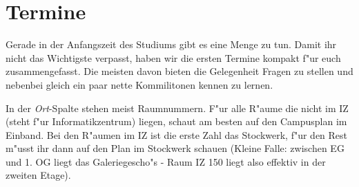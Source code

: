 \section{Termine}
\label{termine}
Gerade in der Anfangszeit des Studiums gibt es eine Menge zu tun. Damit ihr
nicht das Wichtigste verpasst, haben wir die ersten Termine kompakt f"ur
euch zusammengefasst. Die meisten davon bieten die Gelegenheit Fragen zu
stellen und nebenbei gleich ein paar nette Kommilitonen kennen zu lernen.

In der \textit{Ort}-Spalte stehen meist Raumnummern. F"ur alle R"aume die nicht
im IZ (steht f"ur Informatikzentrum) liegen, schaut am besten auf den
Campusplan im Einband. Bei den R"aumen im IZ ist die erste Zahl das Stockwerk, f"ur
den Rest m"usst ihr dann auf den Plan im Stockwerk schauen (Kleine Falle:
zwischen EG und 1. OG liegt das Galeriegescho"s - Raum IZ 150 liegt also
effektiv in der zweiten Etage). \par


